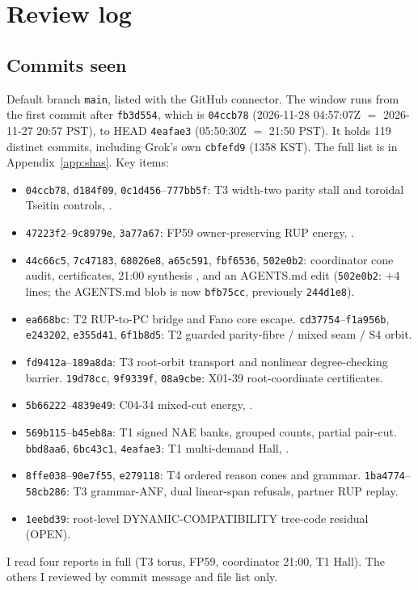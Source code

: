 \documentclass[11pt]{article}
\theoremstyle{definition}
\theoremstyle{remark}
\begin{document}
\section{Review log}
\subsection{Commits seen}
Default branch \texttt{main}, listed with the GitHub connector. The window runs from the
first commit after \texttt{fb3d554}, which is \texttt{04ccb78} (2026-11-28 04:57:07Z $=$
2026-11-27 20:57 PST), to HEAD \texttt{4eafae3} (05:50:30Z $=$ 21:50 PST). It holds 119
distinct commits, including Grok's own \texttt{cbfefd9} (1358 KST). The full list is in
Appendix~\ref{app:shas}. Key items:
\begin{itemize}
\item \texttt{04ccb78}, \texttt{d184f09}, \texttt{0c1d456}--\texttt{777bb5f}: T3 width-two
parity stall and toroidal Tseitin controls,
.
\item \texttt{47223f2}--\texttt{9c8979e}, \texttt{3a77a67}: FP59 owner-preserving RUP energy,
.
\item \texttt{44c66c5}, \texttt{7c47183}, \texttt{68026e8}, \texttt{a65c591}, \texttt{fbf6536},
\texttt{502e0b2}: coordinator cone audit, certificates, 21:00 synthesis
, and an AGENTS.md edit
(\texttt{502e0b2}: $+4$ lines; the AGENTS.md blob is now \texttt{bfb75cc}, previously
\texttt{244d1e8}).
\item \texttt{ea668bc}: T2 RUP-to-PC bridge and Fano core escape. \texttt{cd37754}--\texttt{f1a956b},
\texttt{e243202}, \texttt{e355d41}, \texttt{6f1b8d5}: T2 guarded parity-fibre / mixed seam / S4 orbit.
\item \texttt{fd9412a}--\texttt{189a8da}: T3 root-orbit transport and nonlinear degree-checking
barrier. \texttt{19d78cc}, \texttt{9f9339f}, \texttt{08a9cbe}: X01-39 root-coordinate certificates.
\item \texttt{5b66222}--\texttt{4839e49}: C04-34 mixed-cut energy,
.
\item \texttt{569b115}--\texttt{b45eb8a}: T1 signed NAE banks, grouped counts, partial pair-cut.
\texttt{bbd8aa6}, \texttt{6bc43c1}, \texttt{4eafae3}: T1 multi-demand Hall,
.
\item \texttt{8ffe038}--\texttt{90e7f55}, \texttt{e279118}: T4 ordered reason cones and grammar.
\texttt{1ba4774}--\texttt{58cb286}: T3 grammar-ANF, dual linear-span refusals, partner RUP replay.
\item \texttt{1eebd39}: root-level DYNAMIC-COMPATIBILITY tree-code residual (OPEN).
\end{itemize}
I read four reports in full (T3 torus, FP59, coordinator 21:00, T1 Hall). The others I
reviewed by commit message and file list only.
\end{document}
